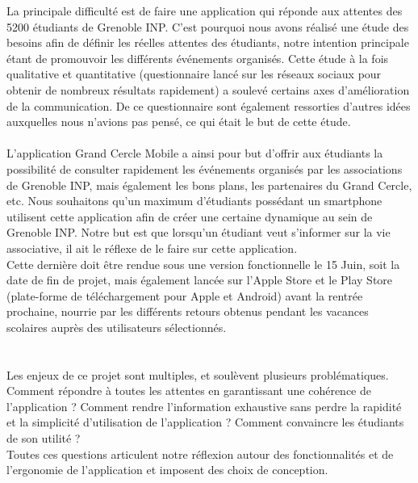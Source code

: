 \documentclass[a4paper,11pt]{article}
\begin{document}
\indent La principale difficulté est de faire une application qui réponde aux attentes des 5200 étudiants de Grenoble INP. C'est pourquoi nous avons réalisé une étude des besoins afin de définir les réelles attentes des étudiants, notre intention principale étant de promouvoir les différents événements organisés. Cette étude à la fois qualitative et quantitative (questionnaire lancé sur les réseaux sociaux pour obtenir de nombreux résultats rapidement) a soulevé certains axes d'amélioration de la communication. De ce questionnaire sont également ressorties d'autres idées auxquelles nous n'avions pas pensé, ce qui était le but de cette étude.\\
\\
\indent L'application Grand Cercle Mobile a ainsi pour but d'offrir aux étudiants la possibilité de consulter rapidement les événements organisés par les associations de Grenoble INP, mais également les bons plans, les partenaires du Grand Cercle, etc. Nous souhaitons qu'un maximum d'étudiants possédant un smartphone utilisent cette application afin de créer une certaine dynamique au sein de Grenoble INP. Notre but est que lorsqu'un étudiant veut s'informer sur la vie associative, il ait le réflexe de le faire sur cette application.\\
\indent Cette dernière doit être rendue sous une version fonctionnelle le 15 Juin, soit la date de fin de projet, mais également lancée sur l'Apple Store et le Play Store (plate-forme de téléchargement pour Apple et Android) avant la rentrée prochaine, nourrie par les différents retours obtenus pendant les vacances scolaires auprès des utilisateurs sélectionnés.\\
\\
\\
\indent Les enjeux de ce projet sont multiples, et soulèvent plusieurs problématiques. Comment répondre à toutes les attentes en garantissant une cohérence de l'application ? Comment rendre l'information exhaustive sans perdre la rapidité et la simplicité d'utilisation de l'application ? Comment convaincre les étudiants de son utilité ?\\
Toutes ces questions articulent notre réflexion autour des fonctionnalités et de l'ergonomie de l'application et imposent des choix de conception.\\
\vspace*{\fill}
\newpage

\end{document}
